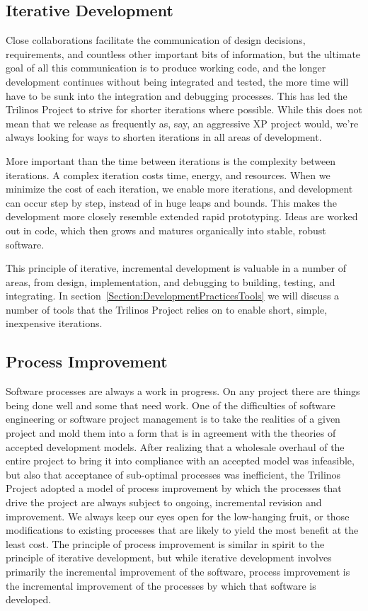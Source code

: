 \documentclass[12pt,relax]{article}
\begin{document}
\subsection{Iterative Development}

Close collaborations facilitate the communication of design decisions, 
requirements, and countless other important bits of information, but the
ultimate goal of all this communication is to produce working code, and the
longer development continues without being integrated and tested, the more
time will have to be sunk into the integration and debugging processes.  This
has led the Trilinos Project to strive for shorter iterations where possible.
While this does not mean that we release as frequently as, say, an aggressive XP
project would, we're always looking for ways to shorten iterations in all
areas of development.

More important than the time between iterations is the complexity between
iterations.  A complex iteration costs time, energy, and resources.  When we
minimize the cost of each iteration, we enable more iterations, and development
can occur step by step, instead of in huge leaps and bounds.  This makes the
development more closely resemble extended rapid prototyping.  Ideas are worked
out in code, which then grows and matures organically into stable, robust
software.

This principle of iterative, incremental development is valuable in a number of
areas, from design, implementation, and debugging to building, testing, and
integrating.  In section~\ref{Section:DevelopmentPracticesTools} we will
discuss a number of tools that the Trilinos Project relies on to enable short,
simple, inexpensive iterations.

\subsection{Process Improvement}

Software processes are always a work in progress.  On any project there are
things being done well and some that need work.  One of the difficulties of 
software engineering or software project management is to take the realities
of a given project and mold them into a form that is in agreement with the
theories of accepted development models.  After realizing that a wholesale 
overhaul of the entire project to bring it into compliance with an accepted
model was infeasible, but also that acceptance of sub-optimal processes was
inefficient, the Trilinos Project adopted a model of process improvement by
which the processes that drive the project are always subject to ongoing,
incremental revision and improvement.  We always keep our eyes open for the 
low-hanging fruit, or those modifications to existing processes that are
likely to yield the most benefit at the least cost.  The principle of process
improvement is similar in spirit to the principle of iterative development, but
while iterative development involves primarily the incremental improvement of
the software, process improvement is the incremental improvement of the
processes by which that software is developed.  
\end{document}

